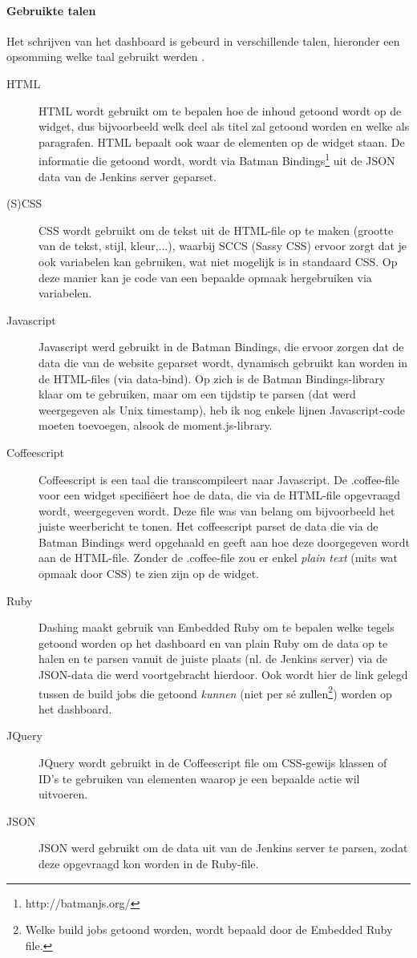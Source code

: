 \documentclass[10pt,a4paper]{article}
\begin{document}
\paragraph{Gebruikte talen}
Het schrijven van het dashboard is gebeurd in verschillende talen, hieronder een opsomming welke taal gebruikt werden .
\begin{description}
\item[HTML] HTML wordt gebruikt om te bepalen hoe de inhoud getoond wordt op de widget, dus bijvoorbeeld welk deel als titel zal getoond worden en welke als paragrafen. HTML bepaalt ook waar de elementen op de widget staan. De informatie die getoond wordt, wordt via Batman Bindings\footnote{http://batmanjs.org/} uit de JSON data van de Jenkins server geparset. 
\item[(S)CSS] CSS wordt gebruikt om de tekst uit de HTML-file op te maken (grootte van de tekst, stijl, kleur,...), waarbij SCCS (Sassy CSS) ervoor zorgt dat je ook variabelen kan gebruiken, wat niet mogelijk is in standaard CSS. Op deze manier kan je code van een bepaalde opmaak hergebruiken via variabelen. 
\item[Javascript] Javascript werd gebruikt in de Batman Bindings, die ervoor zorgen dat de data die van de website geparset wordt, dynamisch gebruikt kan worden in de HTML-files (via data-bind). Op zich is de Batman Bindings-library klaar om te gebruiken, maar om een tijdstip te parsen (dat werd weergegeven als Unix timestamp), heb ik nog enkele lijnen Javascript-code moeten toevoegen, alsook de moment.js-library.
\item[Coffeescript] Coffeescript is een taal die transcompileert naar Javascript. De .coffee-file voor een widget specifi\"eert hoe de data, die via de HTML-file opgevraagd wordt, weergegeven wordt. Deze file was van belang om bijvoorbeeld het juiste weerbericht te tonen. Het coffeescript parset de data die via de Batman Bindings werd opgehaald en geeft aan hoe deze doorgegeven wordt aan de HTML-file. Zonder de .coffee-file zou er enkel \textit{plain text} (mits wat opmaak door CSS) te zien zijn op de widget.
\item[Ruby] Dashing maakt gebruik van Embedded Ruby om te bepalen welke tegels getoond worden op het dashboard en van plain Ruby om de data op te halen en te parsen vanuit de juiste plaats (nl. de Jenkins server) via de JSON-data die werd voortgebracht hierdoor. Ook wordt hier de link gelegd tussen de build jobs die getoond \emph{kunnen} (niet per s\'e zullen\footnote{Welke build jobs getoond worden, wordt bepaald door de Embedded Ruby file.}) worden op het dashboard.
\item[JQuery] JQuery wordt gebruikt in de Coffeescript file om CSS-gewijs klassen of ID's te gebruiken van elementen waarop je een bepaalde actie wil uitvoeren.
\item[JSON] JSON werd gebruikt om de data uit van de Jenkins server te parsen, zodat deze opgevraagd kon worden in de Ruby-file.
\end{description}
\end{document}

